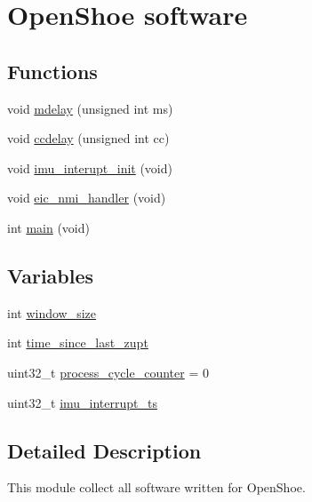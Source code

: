 \hypertarget{group__os__software}{
\section{\-Open\-Shoe software}
\label{group__os__software}
}
\subsection*{\-Functions}
\begin{DoxyCompactItemize}
\item 
void \hyperlink{group__os__software_gad2e794bf09cc3ad6bca0c1fc9c5cfd1a}{mdelay} (unsigned int ms)
\item 
void \hyperlink{group__os__software_ga9fc75f16e84fd18e46de95ad76364418}{ccdelay} (unsigned int cc)
\item 
void \hyperlink{group__os__software_gab157d45366997e63d5799b3f93a8ad40}{imu\-\_\-interupt\-\_\-init} (void)
\item 
void \hyperlink{group__os__software_ga704ef9a891717a7ad0e0248601e6d8e4}{eic\-\_\-nmi\-\_\-handler} (void)
\item 
int \hyperlink{group__os__software_ga840291bc02cba5474a4cb46a9b9566fe}{main} (void)
\end{DoxyCompactItemize}
\subsection*{\-Variables}
\begin{DoxyCompactItemize}
\item 
int \hyperlink{group__os__software_ga1c7df51cd44a9862d56e5a86a7382fe2}{window\-\_\-size}
\item 
int \hyperlink{group__os__software_ga20193da701b182264e8b7bf63293c0f9}{time\-\_\-since\-\_\-last\-\_\-zupt}
\item 
uint32\-\_\-t \hyperlink{group__os__software_ga69242006691a47df6ea85e8cc45ccc43}{process\-\_\-cycle\-\_\-counter} = 0
\item 
uint32\-\_\-t \hyperlink{group__os__software_gabab0bf40697a144a8e46dfe6c4290656}{imu\-\_\-interrupt\-\_\-ts}
\end{DoxyCompactItemize}


\subsection{\-Detailed \-Description}
\-This module collect all software written for \-Open\-Shoe. 

